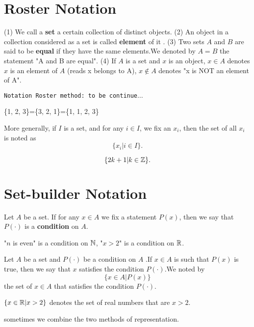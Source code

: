 \documentclass{book}
\numberwithin{equation}{section}
\begin{document}
\section{Roster Notation}
\begin{definitionenv}
    \quad
    \newline
    (1) We call a \textbf{set} a certain collection of distinct objects.
    \newline
    (2) An object in a collection considered as a set is called \textbf{element} of it .
    \newline
    (3) Two sets $A$ and $B$ are said to be \textbf{equal} if they have the same elements.We denoted by $A=B$ the statement "A and B are equal".
    \newline
    (4) If $A$ is a set and $x$ is an object,  $x \in A$ denotes $x$ is an element of $A$ (reads x belongs to A),  $x \notin A$ denotes "x is NOT an element of A".
\end{definitionenv}
\texttt{Notation Roster method: to be continue$\dots$}
\begin{exampleenv}
    \{1, 2, 3\}=\{3, 2, 1\}=\{1, 1, 2, 3\}
\end{exampleenv}
\begin{box2}
More generally,  if $I$ is a set,  and for any $i \in I$,  we fix an $x_i$,  then the set of all $x_i$ is noted as $$\{x_i|i\in I\}.$$
\end{box2}
\begin{exampleenv}
    $$\{2k+1|k\in \mathbb{Z}\}.$$
\end{exampleenv}
\section{Set-builder Notation}
\begin{definitionenv}
    Let $A$ be a set. If for any $x\in A $ we fix a statement $P(x)$,  then we say that $P(\cdot)$ is a \textbf{condition} on $A$. 
\end{definitionenv}
\begin{exampleenv}
    "$n$ is even" is a condition on $\mathbb{N}$,  "$x>2$" is a condition on $\mathbb{R}$.
\end{exampleenv}
\begin{definitionenv}
    Let $A$ be a set and $P(\cdot)$ be a condition on $A$ .If $x\in A$ is such that $P(x)$ is true,  then we say that $x$ satisfies the condition $P(\cdot)$.We noted by $$\{x \in A|P(x)\}$$the set of $x\in A$ that satisfies the condition $P(\cdot)$.
\end{definitionenv}
\begin{exampleenv}
    $\{x\in \mathbb{R}|x>2\}$ denotes the set of real numbers that are $x>2$.
\end{exampleenv}
\begin{box2}
\begin{center}
    sometimes we combine the two methods of representation.
\end{center}
\end{box2}
\end{document}
